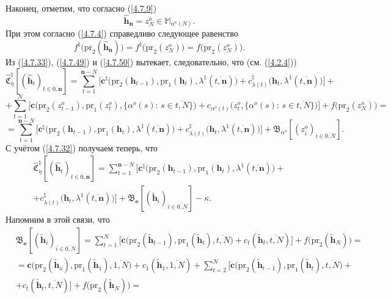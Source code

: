 \documentclass[12pt]{report}
\newcommand{\bfn}{\begin{equation}}
\newcommand{\efn}{\end{equation}}
\newcommand{\ov}{\overline}
\newcommand{\la}{\lambda}
\newcommand{\al}{\alpha}
\newcommand{\zc}{{\mathbf c}}
\newcommand{\nn}{{\mathbf n}}
\begin{document}
{{Наконец, отметим, что согласно (\ref{4.7.9})
$$
\hat{\mathbf{h}}_\nn = z_N^o\in \mathbb{M}_{\al^o(N)}.
$$
При этом согласно (\ref{4.7.4}) справедливо следующее равенство
\bfn\label{4.7.50}f^\natural\bigl(\mathrm{pr}_2(\hat{\mathbf{h}}_\nn)\bigl) =
f^\natural\bigl(\mathrm{pr}_2(z_N^o)\bigl) = f\bigl(\mathrm{pr}_2(z_N^o)\bigl).
\efn
Из (\ref{4.7.33}), (\ref{4.7.49}) и (\ref{4.7.50}) вытекает, следовательно, что (см. (\ref{4.2.4}))
$$
\widehat{\mathfrak{C}}_\eta^\natural[(\hat{\mathbf{h}}_t)_{t\in\ov{0,\nn}}] =
\sum\limits_{t=1}^{\nn-N}\bigl[\zc^\natural\bigl(\mathrm{pr}_2(\mathbf{h}_{t-1}),\mathrm{pr}_1
(\mathbf{h}_t),\la^1(\ov{t,\nn})\bigl) + c_{\la(t)}^\natural\bigl(\mathbf{h}_t,
\la^1(\ov{t,\nn})\bigl)\bigl]+$$ $$+\sum\limits_{t=1}^N \bigl[\zc\bigl(\mathrm{pr}_2(z_{t-1}^o),
\mathrm{pr}_1(z_t^o),\{\al^o(s):\,s\in \ov{t,N}\}\bigl) + c_{\al^o(t)}\bigl(z_t^o,\{\al^o(s):\,
s\in \ov{t,N}\}\bigl)\bigl]+ f\bigl(\mathrm{pr}_2(z_N^o)\bigl) = $$ $$=\sum\limits_{t=1}^{\nn-N}
\bigl[\zc^\natural\bigl(\mathrm{pr}_2(\mathbf{h}_{t-1}),\mathrm{pr}_1
(\mathbf{h}_t),\la^1(\ov{t,\nn})\bigl)+ c_{\la(t)}^\natural\bigl(\mathbf{h}_t,\la^1(\ov{t,\nn})
\bigl)\bigl] + \mathfrak{B}_{\al^o}[(z_i^o)_{i\in\ov{0,N}}].
$$
С учётом (\ref{4.7.32}) получаем теперь, что
\begin{eqnarray}
&\widehat{\mathfrak{C}}_\eta^\natural[(\hat{\mathbf{h}}_t)_{t\in\ov{0,\nn}}] =
\sum\limits_{t=1}^{\nn-N}\bigl[\zc^\natural\bigl(\mathrm{pr}_2(\mathbf{h}_{t-1}),\mathrm{pr}_1
(\mathbf{h}_t),\la^1(\ov{t,\nn})\bigl) +
&\nonumber\\
&+ c_{\la(t)}^\natural\bigl(\mathbf{h}_t,\la^1(\ov{t,\nn})\bigl)\bigl]+
\mathfrak{B}_\mathbf{e}[(\tilde{\mathbf{h}}_i)_{i\in\ov{0,N}}]-\kappa.
&\label{4.7.51}
\end{eqnarray}
 Напомним в этой связи, что
\begin{eqnarray}
&\mathfrak{B}_\mathbf{e}[(\tilde{\mathbf{h}}_i)_{i\in\ov{0,N}}] =
\sum\limits_{t=1}^N\bigl[\zc\bigl(\mathrm{pr}_2(\tilde{\mathbf{h}}_{t-1}),\mathrm{pr}_1
(\tilde{\mathbf{h}}_t),\ov{t,N}) + c_t(\tilde{\mathbf{h}}_t,\ov{t,N})\bigl]+
f\bigl(\mathrm{pr}_2(\tilde{\mathbf{h}}_N)\bigl) =
&\nonumber\\
&=\zc\bigl(\mathrm{pr}_2(\tilde{\mathbf{h}}_o),\mathrm{pr}_1
(\tilde{\mathbf{h}}_1),\ov{1,N}) +c_1(\tilde{\mathbf{h}}_1,\ov{1,N}) +
\sum\limits_{t=2}^N\bigl[\zc\bigl(\mathrm{pr}_2(\tilde{\mathbf{h}}_{t-1}),\mathrm{pr}_1
(\tilde{\mathbf{h}}_t),\ov{t,N}\bigl) +
&\nonumber\\
&+ c_t(\tilde{\mathbf{h}}_t,\ov{t,N})\bigl] + f\bigl(\mathrm{pr}_2(\tilde{\mathbf{h}}_N)\bigl)=

\end{eqnarray}}}
\end{document}
